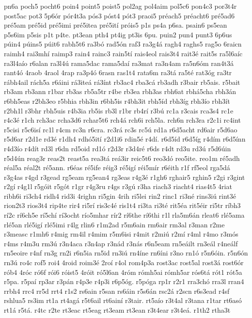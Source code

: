 {pn6a
poch5
pocht6
poin4
point5
poist5
pol2ag
pol4aim
pol5c6
pon4c3
por3t4r
post5ac
pot3
5p6ór
pór4t3a
pós3
póst4
pót3
praoi5
préach5
préacht6
pré5ad6
pré5am
pré5id
pré5imi
pré5itea
pré5ití
próis5
p1s
ps4a
p6sa.
psain6
ps5ean
p5s6im
p5sis
p1t
p4te.
pt3ean
pth4
pt4ig
pt3is
6pu.
puin2
pun4
punt3
6p6us
púin4
púins5
púit6
rabh5t6
ra3bó
rad5ón
raf3
ra3g4á
ragh4
raghs5
rag5o
6raicn
raimh4
rai3mhí
raimp3
rain4
rainc3
rain5tí
rais4eol
rais3t4
rait3é
rait5s
ra5l6aíc
ra3l4aío
r6alan
ra3l4ú
rama5dac
rama5daí
ra3mat
ra3n4am
ra5n6óm
ran4t3á
rant4ó
4raob
4raol
4rap
ra3p4ó
6rasn
ras1t4
rata6m
ra3tá
ra5té
rat3óg
ra3tr
rábh4ail
rách5a
r6áini
rá3iteá
rá3ínt
rb3ac4
rba3cá
rb3adh
r3bair
rb5ais.
r5bait
rb3am
rb3ann
r1bar
rb3as
rb5a5tr
r4be
rb3ea
rbh3as
rbh6at
rbhá5cha
rbh3án
r6bh5eas
r2bh3eo
r5bhia
rbh3in
r6bh5is
r4bh3it
rbh5íd
rbh3íg
rbh3ío
rbh3ít
r2bh1l
r3bhr
rbh5uis
r4b3ia
rb5is
rb3l
r1br
rb4rí
r3bú
rc1a
r3cais
rca3s4
rc1e
r4c3é
r1ch
rch3ac
rcha3d6
rchar5t6
rch4á
rch6i
rch5la.
rch6n
rch3ra
r2c1i
rc4int
r5cisi
r5c6isí
rc1l
r4cm
rc3n
r6cra.
rc3rá
rc3s
rc5ú
rd1a
r6d5acht
rd6air
r5d6ao
r5d6ar
r2d1e
rd3é
r1dh4
rdhó5ití
r2d1i6
rdin5é
r4dí.
r6d5íd
r6d5íg
r4dím
r6d5ínn
r4d3ío
r4dít
rd3l
r6dn
rd5oid
rd1ó
r2d3r
r3d4ré
r6ds
r4dt
rd3u
rd3ú
r5d6úin
r5d4ún
reag3r
reas2t
reast5a
rea3tá
reá3ir
reic5t6
reo3dó
reo5ite.
reo1m
ré5adh
réal5a
réal2t
ré5ann.
r6éas
ré5ife
réig3
ré5igí
réi5mír
r6éith
r1f
rf5eol
rga5dá
r3g4as
r4gd
r3gead
rg5eam
rg5ean4
rg3eas
r4g3é
r1gh6
rghair5
rghin5
r2gi
r3gint
r2gí
r4g1l
r5góit
r5gót
r1gr
r4g3ru
r4gs
r3gú
r3ha
riach3
riacht4
rias4t5
4riat
ribh6i
ri3ch4
ridh4
rid3i
4righn
ri5gin
4rih
ri5lei
rin2
rinc1
ri3né
rins3iú
rint3é
rion2t3
rios3t4
rip4te
rir4
ri5rí
ris3c4é
ris1t4
ri3ta
ri3té
rit5éa
rit5éir
ri5tr
ríbh3
rí2c
rí6ch5e
rí5chí
rí3ocht
río5mhar
rír2
rí6the
rí6thi
r1l
rla5m6án
rleat6
rlé5ama
rlé5an
rlé5igí
rlé5imi
r4lg
rlin6
r1m2ad
r5m6ain
rm6air
rm3al
r3man
r2me
r3measc
r1mh6
r4mig
rm4il
r4mim
r5m6isi
r4mit
r2miú
r2mí
r4ml
r4mo
r3mós
r4ms
r4m3u
rm3ú
r3n4aca
r3n4ap
r3nád
r3nás
r6n5eam
rn5eáilt
rn3eál
r4neálf
rn5eoire
r4nf
rn3g
rn2i
r6n5ia
rn5id
rn3iú
rn4íne
rn6íni
r3no
rn1ó
r5n6óin.
r5n6ón
rn3ú
ro4c
rof5
roi4
4roid
roim3é
2roí
r4ol
rom4p3a
rost3ac
rost5al
rost3á
rost6ór
rób4
4róc
ró6f
rói6
róist5
4róit
ró5l6an
4róm
rómh5ai
rómh5ar
rós6tá
rót1
rót5a
r5pa.
r5paí
rp3ar
r3pán
r4p3e
r4p3i
r6p5óg.
r5póga
rp1r
r2r1
rra3chó
rra3l
rran4
rrbh4
rrc4
rr5d
rrt4
r1s2
rs6ain
r5san
rs6áin
r5s6án
rsc2á
r2scn
r6s3ead
r4sf
rshlua5
rs3im
rt1a
rt4agá
r5t6ail
rt6ainí
r3tair.
rt5aío
r3t4al
r3tana
r1tar
rt6asó
rt1á
r5tá.
r4tc
r2te
rt3eac
rt5eag
rt3eam
rt3ean
r3t4ear
r3t4eá.
r1th2
rtha3t
}
